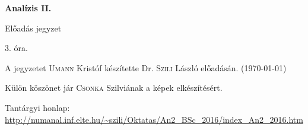 \documentclass[a4paper,11.5pt]{article}
\begin{document}
	\setlength\parindent{0pt}
	\def\s{\hspace{0.2mm}\vphantom{\beta}}
	\def\Z{\mathbb{Z}}
	\def\Q{\mathbb{Q}}
	\def\R{\mathbb{R}}
	\def\C{\mathbb{C}}
	\def\N{\mathbb{N}}
	\def\Ra{\overline{\mathbb{R}}}
	
	\def\sume{\displaystyle\sum_{n=1}^{+\infty}}
	\def\sumn{\displaystyle\sum_{n=0}^{+\infty}}
	
	\def\narrow{\underset{n\rightarrow+\infty}{\longrightarrow}}
	\def\limn{\displaystyle\lim_{n\to +\infty}}
	\def\limx{\displaystyle\lim_{x\to +\infty}}
	
	\theoremstyle{definition}
	\newtheorem{theorem}{Tétel}[subsection] 
	
	\theoremstyle{definition}
	\newtheorem{definition}[theorem]{Definíció} 
	\newtheorem{example}[theorem]{Példa} 
	\newtheorem{task}[theorem]{Feladat} 
	\newtheorem{note}[theorem]{Megjegyzés}
	\newtheorem{revision}[theorem]{Emlékeztető}
	\begin{center}
		{\LARGE\textbf{Analízis II.}}
		
		{\Large Előadás jegyzet}
		
		3. óra.
	\end{center}
	A jegyzetet \textsc{Umann} Kristóf készítette Dr. \textsc{Szili} László  előadásán. (\today)
	
	Külön köszönet jár \textsc{Csonka} Szilviának a képek elkészítésért.
	\bigskip
	
	Tantárgyi honlap: \url{http://numanal.inf.elte.hu/~szili/Oktatas/An2_BSc_2016/index_An2_2016.htm}
	
\end{document}
